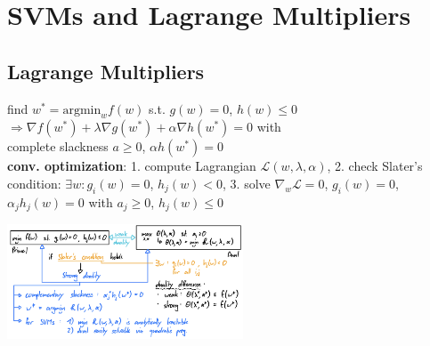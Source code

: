 
\section{SVMs and Lagrange Multipliers}

\subsection*{Lagrange Multipliers}
find $w^* = \text{argmin}_w f(w)$ s.t. $g(w)=0$, $h(w) \leq 0$\\
$\Rightarrow \nabla f(w^*) + \lambda \nabla g(w^*) + \alpha \nabla h(w^*) = 0$ with \\ complete slackness $a \geq 0$, $\alpha h(w^*)=0$ \\
\textbf{conv. optimization}: 1. compute Lagrangian $\mathcal{L}(w,\lambda,\alpha)$, 2. check Slater's condition: $\exists w : g_i(w)=0$, $h_j(w) < 0$, 3. solve $\nabla_w \mathcal{L} = 0$, $g_i(w)=0$, $\alpha_j h_j (w) = 0$ with $a_j \geq 0$, $h_j(w) \leq 0$

\includegraphics[width=7cm]{lagrangian multipliers.png}


